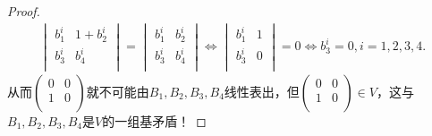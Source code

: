 \documentclass[../../main.tex]{subfiles}
\begin{document}
\begin{proof}
\begin{align*}
\begin{vmatrix}
b_{1}^{i}&		1+b_{2}^{i}\\
b_{3}^{i}&		b_{4}^{i}\\
\end{vmatrix}=\begin{vmatrix}
b_{1}^{i}&		b_{2}^{i}\\
b_{3}^{i}&		b_{4}^{i}\\
\end{vmatrix}
\Longleftrightarrow \begin{vmatrix}
b_{1}^{i}&		1\\
b_{3}^{i}&		0\\
\end{vmatrix}=0\Longleftrightarrow b_{3}^{i}=0,i=1,2,3,4.
\end{align*}
从而$\begin{pmatrix}
0&		0\\
1&		0\\
\end{pmatrix}$就不可能由$B_1,B_2,B_3,B_4$线性表出，但$\begin{pmatrix}
0&		0\\
1&		0\\
\end{pmatrix} \in V$，这与$B_1,B_2,B_3,B_4$是$V$的一组基矛盾！

\end{proof}
\end{document}
